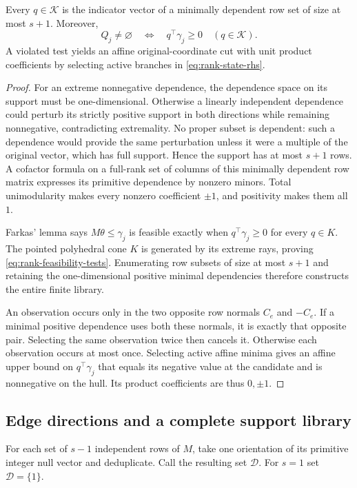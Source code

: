 \begin{lemma}\label{lem:rank-circuits}
Every $q\in\mathcal K$ is the indicator vector of a minimally dependent
row set of size at most $s+1$. Moreover,
\begin{equation}\label{eq:rank-feasibility-tests}
 Q_j\ne\varnothing\quad\Longleftrightarrow\quad
             q^\top\gamma_j\ge0\quad(q\in\mathcal K).
\end{equation}
A violated test yields an affine original-coordinate cut with unit
product coefficients by selecting active branches in \eqref{eq:rank-state-rhs}.
\end{lemma}
\begin{proof}
For an extreme nonnegative dependence, the dependence space on its support
must be one-dimensional. Otherwise a linearly independent dependence could
perturb its strictly positive support in both directions while remaining
nonnegative, contradicting extremality. No proper subset is dependent:
such a dependence would provide the same perturbation unless it were a
multiple of the original vector, which has full support. Hence the support
has at most $s+1$ rows. A cofactor formula on a full-rank set of columns
of this minimally dependent row matrix expresses its primitive dependence
by nonzero minors. Total unimodularity makes every nonzero coefficient
$\pm1$, and positivity makes them all $1$.

Farkas' lemma says $M\theta\le\gamma_j$ is feasible exactly when
$q^\top\gamma_j\ge0$ for every $q\in K$. The pointed polyhedral cone
$K$ is generated by its extreme rays, proving
\eqref{eq:rank-feasibility-tests}. Enumerating row subsets of size at
most $s+1$ and retaining the one-dimensional positive minimal dependencies
therefore constructs the entire finite library.

An observation occurs only in the two opposite row normals $C_e$ and
$-C_e$. If a minimal positive dependence uses both these normals, it is
exactly that opposite pair. Selecting the same observation twice then
cancels it. Otherwise each observation occurs at most once. Selecting
active affine minima gives an affine upper bound on
$q^\top\gamma_j$ that equals its negative value at the candidate and
is nonnegative on the hull. Its product coefficients are thus $0,\pm1$.
\end{proof}

\subsection{Edge directions and a complete support library}\label{subsec:rank-support-rays}
For each set of $s-1$ independent rows of $M$, take one orientation of
its primitive integer null vector and deduplicate. Call the resulting
set $\mathcal D$. For $s=1$ set $\mathcal D=\{1\}$.

